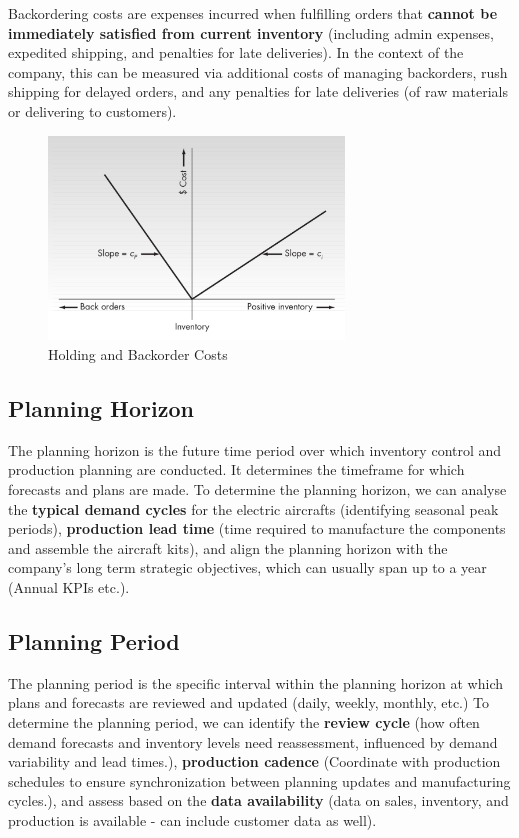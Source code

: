 \documentclass[12pt]{article}
\begin{document}
Backordering costs are expenses incurred when fulfilling orders that \textbf{cannot be immediately satisfied from current inventory} (including admin expenses, expedited shipping, and penalties for late deliveries). In the context of the company, this can be measured via additional costs of managing backorders, rush shipping for delayed orders, and any penalties for late deliveries (of raw materials or delivering to customers). 

\begin{figure}[H]
    \centering
    \includegraphics[width=0.7\textwidth]{Images/backordercost.png}
    \caption{Holding and Backorder Costs}
    \label{fig:1-backordercost}
\end{figure} 

\subsection*{Planning Horizon}

The planning horizon is the future time period over which inventory control and production planning are conducted. It determines the timeframe for which forecasts and plans are made. To determine the planning horizon, we can analyse the \textbf{typical demand cycles} for the electric aircrafts (identifying seasonal peak periods), \textbf{production lead time} (time required to manufacture the components and assemble the aircraft kits), and align the planning horizon with the company's long term strategic objectives, which can usually span up to a year (Annual KPIs etc.). 

\subsection*{Planning Period}

The planning period is the specific interval within the planning horizon at which plans and forecasts are reviewed and updated (daily, weekly, monthly, etc.) To determine the planning period, we can identify the \textbf{review cycle} (how often demand forecasts and inventory levels need reassessment, influenced by demand variability and lead times.), \textbf{production cadence} (Coordinate with production schedules to ensure synchronization between planning updates and manufacturing cycles.), and assess based on the \textbf{data availability} (data on sales, inventory, and production is available - can include customer data as well). 
\end{document}
